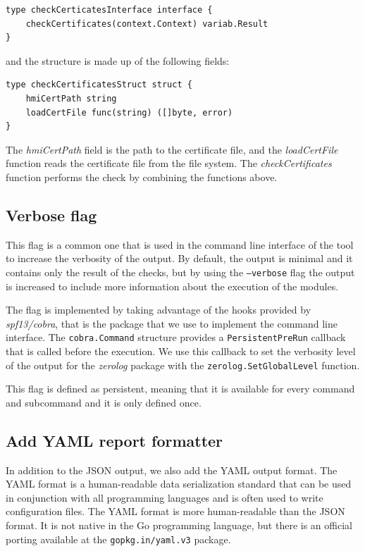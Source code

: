 \begin{lstlisting}[style=golang]
type checkCerticatesInterface interface {
	checkCertificates(context.Context) variab.Result
}
\end{lstlisting}

and the structure is made up of the following fields:

\begin{lstlisting}[style=golang]
type checkCertificatesStruct struct {
	hmiCertPath string
	loadCertFile func(string) ([]byte, error)
}
\end{lstlisting}

The \textit{hmiCertPath} field is the path to the certificate file, and the \textit{loadCertFile} function reads the certificate file from the file system. The \textit{checkCertificates} function performs the check by combining the functions above.

\subsection{Verbose flag}

This flag is a common one that is used in the command line interface of the tool to increase the verbosity of the output. By default, the output is minimal and it contains only the result of the checks, but by using the \texttt{--verbose} flag the output is increased to include more information about the execution of the modules.

The flag is implemented by taking advantage of the hooks provided by \textit{spf13/cobra}, that is the package that we use to implement the command line interface. The \texttt{cobra.Command} structure provides a \texttt{PersistentPreRun} callback that is called before the execution. We use this callback to set the verbosity level of the output for the \textit{zerolog} package with the \texttt{zerolog.SetGlobalLevel} function.

This flag is defined as persistent, meaning that it is available for every command and subcommand and it is only defined once.

\subsection{Add YAML report formatter}

In addition to the JSON output, we also add the YAML output format. The YAML format is a human-readable data serialization standard that can be used in conjunction with all programming languages and is often used to write configuration files. The YAML format is more human-readable than the JSON format. It is not native in the Go programming language, but there is an official porting available at the \texttt{gopkg.in/yaml.v3} package.

